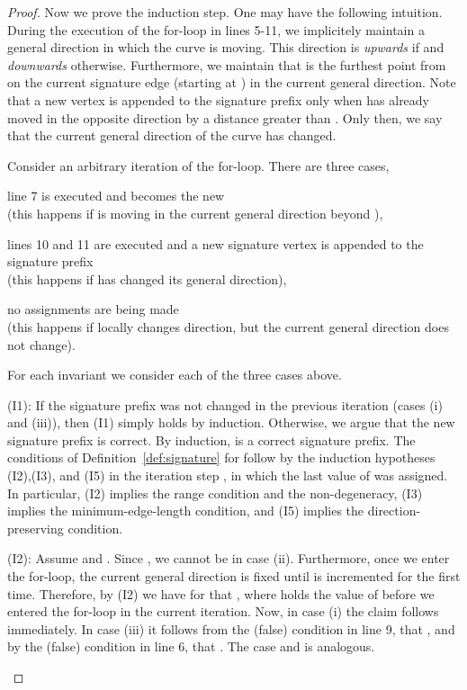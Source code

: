 \documentclass[11pt, letter]{article}
\newcommand{\defref}[1]{Definition~\ref{def:#1}}
\begin{document}
\begin{proof}
Now we prove the induction step.  One may have the following intuition.
During the execution of the for-loop in lines 5-11, we implicitely maintain a
general direction in which the curve  is moving. 
This direction is \emph{upwards} if  and
\emph{downwards} otherwise.
Furthermore, we maintain that  is the furthest point from 
on the current signature edge (starting at ) in the current general
direction.
Note that a new vertex is appended to the signature prefix only when  has
already moved in the opposite direction by a distance greater than .
Only then, we say that the current general direction of the curve has changed.

Consider an arbitrary iteration  of the for-loop. There are three cases,
\begin{compactenum}[(i)]
\item line 7 is executed and  becomes the new \\
(this happens if  is moving in the current general direction beyond
),
\item lines 10 and 11 are executed and a new signature vertex is appended to the
signature prefix\\
(this happens if  has changed its general direction), 
\item no assignments are being made\\
(this happens if  locally changes direction, but the current general
direction does not change).
\end{compactenum}

For each invariant we consider each of the three cases above.
\begin{compactitem}
\item (I1): If the signature prefix was not changed in the previous iteration
(cases (i) and (iii)), then (I1) simply holds by induction. Otherwise, we argue
that the new signature prefix is correct. By induction,
 is a correct signature prefix.  
The conditions of \defref{signature} for  follow by the induction
hypotheses (I2),(I3), and (I5) in the iteration step , in which the last 
value of  was assigned. In particular, (I2) implies the range condition
and the non-degeneracy, (I3) implies the minimum-edge-length condition, and (I5)
implies the direction-preserving condition.

\item (I2): Assume  and . Since , we cannot be in
case (ii). Furthermore, once we enter the for-loop, the current general
direction is fixed until  is incremented for the first time. 
Therefore, by (I2) we have for  that ,
where  holds the value of  before we entered the for-loop in the current
iteration.  Now, in case (i) the claim follows immediately.
In case (iii) it follows from the (false) condition in line 9, that
, and by the (false)
condition in line 6, that . 
The case  and  is analogous.


\end{compactitem}
\end{proof}
\end{document}
